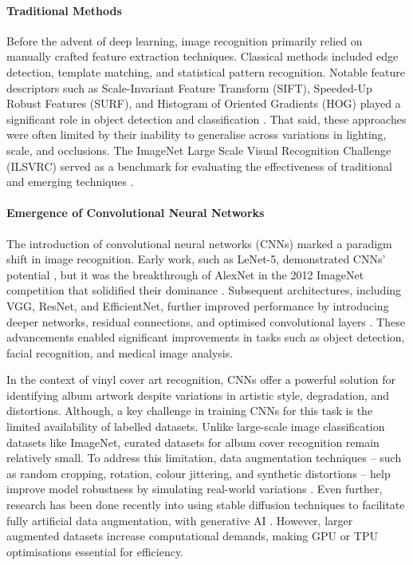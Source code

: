             \paragraph{Traditional Methods}
            
                Before the advent of deep learning, image recognition primarily relied on manually crafted feature extraction techniques. Classical methods included edge detection, template matching, and statistical pattern recognition. Notable feature descriptors such as Scale-Invariant Feature Transform (SIFT), Speeded-Up Robust Features (SURF), and Histogram of Oriented Gradients (HOG) played a significant role in object detection and classification \cite{pal2001pattern}. That said, these approaches were often limited by their inability to generalise across variations in lighting, scale, and occlusions. The ImageNet Large Scale Visual Recognition Challenge (ILSVRC) served as a benchmark for evaluating the effectiveness of traditional and emerging techniques \cite{russakovsky2015imagenetlargescalevisual}.
            
            \paragraph{Emergence of Convolutional Neural Networks}
            
                The introduction of convolutional neural networks (CNNs) marked a paradigm shift in image recognition. Early work, such as LeNet-5, demonstrated CNNs' potential \cite{726791}, but it was the breakthrough of AlexNet in the 2012 ImageNet competition that solidified their dominance \cite{imagenetclasscnn}. Subsequent architectures, including VGG, ResNet, and EfficientNet, further improved performance by introducing deeper networks, residual connections, and optimised convolutional layers \cite{deppcnnsforimagerecognition}. These advancements enabled significant improvements in tasks such as object detection, facial recognition, and medical image analysis.
    
                In the context of vinyl cover art recognition, CNNs offer a powerful solution for identifying album artwork despite variations in artistic style, degradation, and distortions. Although, a key challenge in training CNNs for this task is the limited availability of labelled datasets. Unlike large-scale image classification datasets like ImageNet, curated datasets for album cover recognition remain relatively small. To address this limitation, data augmentation techniques -- such as random cropping, rotation, colour jittering, and synthetic distortions -- help improve model robustness by simulating real-world variations \cite{LIN2025102660}. Even further, research has been done recently into using stable diffusion techniques to facilitate fully artificial data augmentation, with generative AI \cite{Alimisis2025}. However, larger augmented datasets increase computational demands, making GPU or TPU optimisations essential for efficiency.
    
